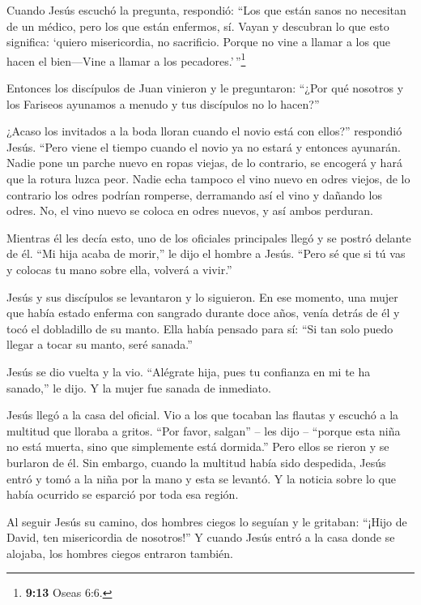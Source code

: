  Cuando Jesús escuchó la pregunta, respondió: ``Los que
están sanos no necesitan de un médico, pero los que están enfermos, sí.
 Vayan y descubran lo que esto significa: `quiero
misericordia, no sacrificio. Porque no vine a llamar a los que hacen el
bien---Vine a llamar a los pecadores.'\,''\footnote{\textbf{9:13} Oseas
  6:6.}

 Entonces los discípulos de Juan vinieron y le preguntaron:
``¿Por qué nosotros y los Fariseos ayunamos a menudo y tus discípulos no
lo hacen?''

 ¿Acaso los invitados a la boda lloran cuando el novio está
con ellos?'' respondió Jesús. ``Pero viene el tiempo cuando el novio ya
no estará y entonces ayunarán.  Nadie pone un parche nuevo
en ropas viejas, de lo contrario, se encogerá y hará que la rotura luzca
peor.  Nadie echa tampoco el vino nuevo en odres viejos, de
lo contrario los odres podrían romperse, derramando así el vino y
dañando los odres. No, el vino nuevo se coloca en odres nuevos, y así
ambos perduran.

 Mientras él les decía esto, uno de los oficiales
principales llegó y se postró delante de él. ``Mi hija acaba de morir,''
le dijo el hombre a Jesús. ``Pero sé que si tú vas y colocas tu mano
sobre ella, volverá a vivir.''

 Jesús y sus discípulos se levantaron y lo siguieron.
 En ese momento, una mujer que había estado enferma con
sangrado durante doce años, venía detrás de él y tocó el dobladillo de
su manto.  Ella había pensado para sí: ``Si tan solo puedo
llegar a tocar su manto, seré sanada.''

 Jesús se dio vuelta y la vio. ``Alégrate hija, pues tu
confianza en mi te ha sanado,'' le dijo. Y la mujer fue sanada de
inmediato.

 Jesús llegó a la casa del oficial. Vio a los que tocaban
las flautas y escuchó a la multitud que lloraba a gritos. 
``Por favor, salgan'' -- les dijo -- ``porque esta niña no está muerta,
sino que simplemente está dormida.'' Pero ellos se rieron y se burlaron
de él.  Sin embargo, cuando la multitud había sido
despedida, Jesús entró y tomó a la niña por la mano y esta se levantó.
 Y la noticia sobre lo que había ocurrido se esparció por
toda esa región.

 Al seguir Jesús su camino, dos hombres ciegos lo seguían y
le gritaban: ``¡Hijo de David, ten misericordia de nosotros!''
 Y cuando Jesús entró a la casa donde se alojaba, los
hombres ciegos entraron también.

